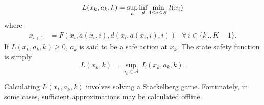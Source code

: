 \documentclass{article}
\newcommand{\aspace}{\ensuremath{\mathcal{A}} }
\begin{document}
\begin{equation}
    L(x_k, a_k, k) = \underset{a}{\sup}\,\underset{d}{\inf}\,\underset{1\leq i\leq K}{\min}\,l(x_i) \\
\end{equation}
where
\begin{equation*}
    \begin{aligned}
        x_{i+1} &= F(x_i, a(x_i, i), d(x_i, a(x_i, i), i)) & \forall\, i \in \{k\,..\,K-1\} \text{.}
    \end{aligned}
\end{equation*}
If $L(x_k, a_k, k) \geq 0$, $a_k$ is said to be a safe action at $x_k$. The state safety function is simply
\begin{equation}
    L(x_k, k) = \underset{a_k\in\aspace}{\sup}\,L(x_k,a_k,k) \text{.}
\end{equation}

Calculating $L(x_k,a_k,k)$ involves solving a Stackelberg game. Fortunately, in some cases, sufficient approximations may be calculated offline.

% 
% 


\end{document}
